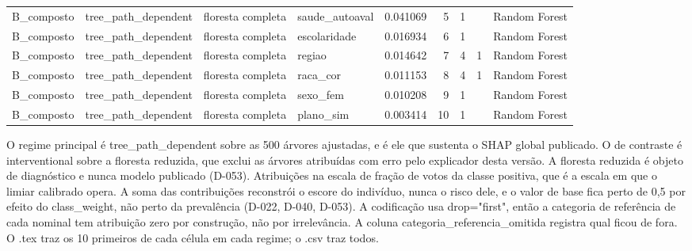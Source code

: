 \begin{tabular}{llllrrrll}
B_composto & tree_path_dependent & floresta completa & saude_autoaval & 0.041069 & 5 & 1 &  & Random Forest \\
B_composto & tree_path_dependent & floresta completa & escolaridade & 0.016934 & 6 & 1 &  & Random Forest \\
B_composto & tree_path_dependent & floresta completa & regiao & 0.014642 & 7 & 4 & 1 & Random Forest \\
B_composto & tree_path_dependent & floresta completa & raca_cor & 0.011153 & 8 & 4 & 1 & Random Forest \\
B_composto & tree_path_dependent & floresta completa & sexo_fem & 0.010208 & 9 & 1 &  & Random Forest \\
B_composto & tree_path_dependent & floresta completa & plano_sim & 0.003414 & 10 & 1 &  & Random Forest \\
\bottomrule
\end{tabular}

\begin{flushleft}
\footnotesize O regime principal é tree\_path\_dependent sobre as 500 árvores ajustadas, e é ele que sustenta o SHAP global publicado. O de contraste é interventional sobre a floresta reduzida, que exclui as árvores atribuídas com erro pelo explicador desta versão. A floresta reduzida é objeto de diagnóstico e nunca modelo publicado (D-053). Atribuições na escala de fração de votos da classe positiva, que é a escala em que o limiar calibrado opera. A soma das contribuições reconstrói o escore do indivíduo, nunca o risco dele, e o valor de base fica perto de 0,5 por efeito do class\_weight, não perto da prevalência (D-022, D-040, D-053). A codificação usa drop="first", então a categoria de referência de cada nominal tem atribuição zero por construção, não por irrelevância. A coluna categoria\_referencia\_omitida registra qual ficou de fora. O .tex traz os 10 primeiros de cada célula em cada regime; o .csv traz todos.
\end{flushleft}
